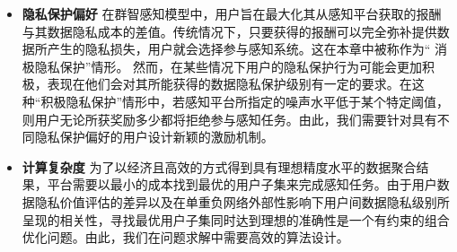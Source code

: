 \begin{itemize}
		
	    	\item {\bfseries 隐私保护偏好} 
		在群智感知模型中，用户旨在最大化其从感知平台获取的报酬与其数据隐私成本的差值。传统情况下，只要获得的报酬可以完全弥补提供数据所产生的隐私损失，用户就会选择参与感知系统。这在本章中被称作为“ 消极隐私保护”情形。
		然而，在某些情况下用户的隐私保护行为可能会更加积极，表现在他们会对其所能获得的数据隐私保护级别有一定的要求。在这种“积极隐私保护”情形中，若感知平台所指定的噪声水平低于某个特定阈值，则用户无论所获奖励多少都将拒绝参与感知任务。由此，我们需要针对具有不同隐私保护偏好的用户设计新颖的激励机制。
	

		
		\item  {\bfseries 计算复杂度} 为了以经济且高效的方式得到具有理想精度水平的数据聚合结果，平台需要以最小的成本找到最优的用户子集来完成感知任务。由于用户数据隐私价值评估的差异以及在单重负网络外部性影响下用户间数据隐私级别所呈现的相关性，寻找最优用户子集同时达到理想的准确性是一个有约束的组合优化问题。由此，我们在问题求解中需要高效的算法设计。
	\end{itemize}
	

